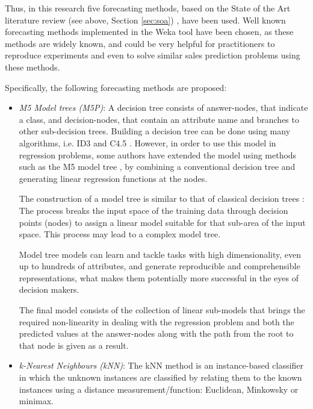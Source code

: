\documentclass[a4paper,10pt,twocolumn,preprint,3p]{elsarticle}
\begin{document}
Thus, in this research five forecasting methods, based on the State of the Art 
literature review (see above, Section \ref{sec:soa}) 
\cite{Madsen2008,ChingChin2010,Thomassey2012,Xia2012,SThomassey2014}, 
have been used. 
Well known forecasting methods implemented in the Weka tool have been chosen, 
as these methods are widely known, and could be very helpful for practitioners 
to reproduce experiments and even to solve similar sales prediction problems 
using these methods.

Specifically, the following forecasting methods are proposed: 

\begin{itemize}

 \item \emph{M5 Model trees (M5P)}: 
A decision tree consists of answer-nodes, that indicate a class, and decision-nodes, 
that contain an attribute name and branches to other sub-decision trees.
Building a decision tree can be done using many algorithms, i.e. ID3 and C4.5 \cite{Quinlan1986}.
However, in order to use this model in regression problems, some authors have 
extended the model using methods such as the M5 model tree \cite{Quinlan1986,Quinlan1992,Wang1997,WittenFrank2000}, 
by combining a conventional decision tree and generating linear regression 
functions at the nodes.

The construction of a model tree is similar to that of classical decision 
trees \cite{Solomatine2004}:
The process breaks the input space of the training data through decision points 
(nodes) to assign a linear model suitable for that sub-area of the input space. 
This process may lead to a complex model tree.

Model tree models can learn and tackle tasks with high dimensionality, even up to 
hundreds of attributes, and generate reproducible and comprehensible representations, 
what makes them potentially more successful in the eyes of decision makers.

The final model consists of the collection of linear sub-models that brings the 
required non-linearity in dealing with the regression problem
and both the predicted values at the answer-nodes along with the path from the 
root to that node is given as a result.


 \item \emph{k-Nearest Neighbours (kNN)}: 
The kNN \cite{Aha1991,Mitchell1997} method is an instance-based classifier in 
which the unknown instances are classified by relating them to the known 
instances using a distance measurement/function: Euclidean, Minkowsky or minimax.


\end{itemize}
\end{document}
